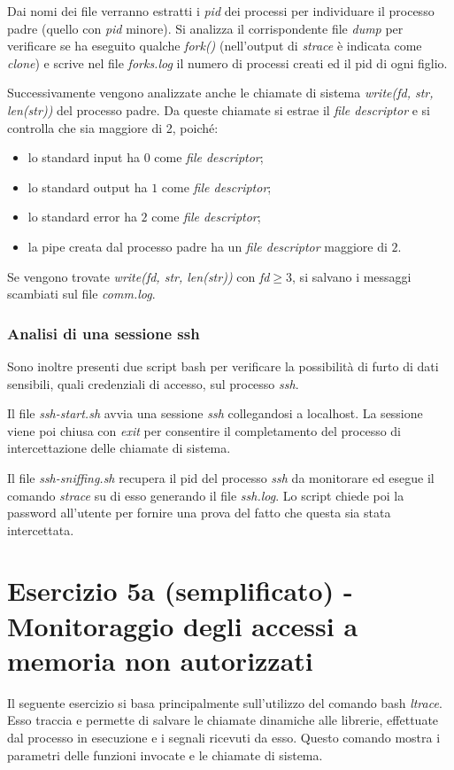 \documentclass[a4paper, 12pt]{article}
\begin{document}
	Dai nomi dei file verranno estratti i \textit{pid} dei processi per individuare il processo padre (quello con \textit{pid} minore). Si analizza il corrispondente file \textit{dump} per verificare se ha eseguito qualche \textit{fork()} (nell'output di \textit{strace} è indicata come \textit{clone}) e scrive nel file \textit{forks.log} il numero di processi creati ed il pid di ogni figlio.
	
	Successivamente vengono analizzate anche le chiamate di sistema \textit{write(fd, str, len(str))} del processo padre. Da queste chiamate si estrae il \textit{file descriptor} e si controlla che sia maggiore di 2, poiché:
	\begin{itemize}
		\item lo standard input ha $0$ come \textit{file descriptor};
		\item lo standard output ha $1$ come \textit{file descriptor}; 
		\item lo standard error ha $2$ come \textit{file descriptor};
		\item la pipe creata dal processo padre ha un \textit{file descriptor} maggiore di $2$.
	\end{itemize}
	
	\noindent
	Se vengono trovate \textit{write(fd, str, len(str))} con \textit{fd}$\geq3$, si salvano i messaggi scambiati sul file \textit{comm.log}.
	
	\subsubsection*{Analisi di una sessione ssh}
	Sono inoltre presenti due script bash per verificare la possibilità di furto di dati sensibili, quali credenziali di accesso, sul processo \textit{ssh}.
	
	Il file \textit{ssh-start.sh} avvia una sessione \textit{ssh} collegandosi a localhost. La sessione viene poi chiusa con \textit{exit} per consentire il completamento del processo di intercettazione delle chiamate di sistema. 
	
	Il file \textit{ssh-sniffing.sh} recupera il pid del processo \textit{ssh} da monitorare ed esegue il comando \textit{strace} su di esso generando il file \textit{ssh.log}. Lo script chiede poi la password all'utente per fornire una prova del fatto che questa sia stata intercettata.
	
	\newpage
	\section*{Esercizio 5a (semplificato) - Monitoraggio degli accessi a memoria non autorizzati}
	Il seguente esercizio si basa principalmente sull'utilizzo del comando bash \textit{ltrace}. Esso traccia e permette di salvare le chiamate dinamiche alle librerie, effettuate dal processo in esecuzione e i segnali ricevuti da esso. Questo comando mostra i parametri delle funzioni invocate e le chiamate di sistema.
	
\end{document}
